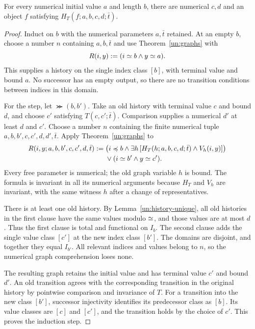 \begin{theorem}
\label{un:history-total}
For every numerical initial value $a$ and length $b$, there are numerical
$c,d$ and an object $f$ satisfying $H_T(f;a,b,c,d;\bar t)$.
\end{theorem}
\begin{proof}
Induct on $b$ with the numerical parameters $a,\bar t$ retained.
At an empty $b$, choose a number $n$ containing $a,b,\bar t$ and use
Theorem~\ref{un:graphs} with
\[
                         R(i,y):=(i\mathrel{\simeq} b\land y\mathrel{\simeq} a).
\]
This supplies a history on the single index class $[b]$, with terminal
value and bound $a$. No successor has an empty output, so there are no
transition conditions between indices in this domain.

For the step, let $\Succ(b,b')$. Take an old history with terminal
value $c$ and bound $d$, and choose $c'$ satisfying $T(c,c';\bar t)$.
Comparison supplies a numerical $d'$ at least $d$ and $c'$. Choose a
number $n$ containing the finite numerical tuple
$a,b,b',c,c',d,d',\bar t$. Apply Theorem~\ref{un:graphs} to
\begin{equation}\label{un:canonical-extension}
\begin{split}
 R(i,y;a,b,b',c,c',d,\bar t):={}&
 \bigl(i\preccurlyeq b\land
   \exists h\,[H_T(h;a,b,c,d;\bar t)\land V_h(i,y)]\bigr)\\
 &\lor(i\mathrel{\simeq} b'\land y\mathrel{\simeq} c').
\end{split}
\end{equation}
Every free parameter is numerical; the old graph variable $h$ is
bound. The formula is invariant in all its numerical arguments because
$H_T$ and $V_h$ are invariant, with the same witness $h$ after a change
of representatives.

There is at least one old history. By Lemma~\ref{un:history-unique},
all old histories in the first clause have the same values modulo
$\mathrel{\simeq}$, and those values are at most $d$. Thus the first clause is
total and functional on $I_b$. The second clause adds the single
value class $[c']$ at the new index class $[b']$. The domains are
disjoint, and together they equal $I_{b'}$. All relevant indices and
values belong to $n$, so the numerical graph comprehension loses none.

The resulting graph retains the initial value and has terminal value
$c'$ and bound $d'$. An old transition agrees with the corresponding
transition in the original history by pointwise comparison and
invariance of $T$. For a transition into the new class $[b']$,
successor injectivity identifies its predecessor class as $[b]$.
Its value classes are $[c]$ and $[c']$, and the transition holds by
the choice of $c'$. This proves the induction step.
\end{proof}

